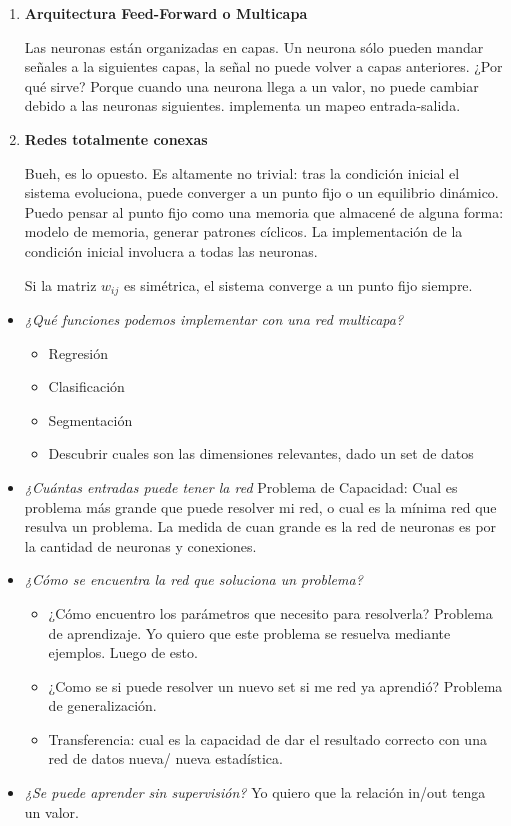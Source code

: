 \begin{enumerate}
	\item {\bf Arquitectura Feed-Forward o Multicapa}

Las neuronas están organizadas en capas. Un neurona sólo pueden mandar señales a la siguientes capas, la señal no puede volver a capas anteriores. ¿Por qué sirve? Porque cuando una neurona llega a un valor, no puede cambiar debido a las neuronas siguientes. implementa un mapeo entrada-salida.

	\item {\bf Redes totalmente conexas}

Bueh, es lo opuesto. Es altamente no trivial: tras la condición inicial el sistema evoluciona, puede converger a un punto fijo o un equilibrio dinámico. Puedo pensar al punto fijo como una memoria que almacené de alguna forma: modelo de memoria, generar patrones cíclicos. La implementación de la condición inicial involucra a todas las neuronas.

Si la matriz $w_{ij}$ es simétrica, el sistema converge a un punto fijo siempre. 


\end{enumerate}


\begin{itemize}
	\item {\sl ¿Qué funciones podemos implementar con una red multicapa?}
	\begin{itemize}
		\item Regresión
		\item Clasificación
		\item Segmentación
		\item Descubrir cuales son las dimensiones relevantes, dado un set de datos
	\end{itemize}
	\item {\sl ¿Cuántas entradas puede tener la red} Problema de Capacidad: Cual es problema más grande que puede resolver mi red, o cual es la mínima red que resulva un problema. La medida de cuan grande es la red de neuronas es por la cantidad de neuronas y conexiones.
	\item {\sl ¿Cómo se encuentra la red que soluciona un problema?}
	\begin{itemize}
		\item ¿Cómo encuentro los parámetros que necesito para resolverla? Problema de aprendizaje. Yo quiero que este problema se resuelva mediante ejemplos. Luego de esto.
		\item ¿Como se si puede resolver un nuevo set si me red ya aprendió? Problema de generalización. 
		\item Transferencia: cual es la capacidad de dar el resultado correcto con una red de datos nueva/ nueva estadística.
	\end{itemize}
	\item {\sl ¿Se puede aprender sin supervisión?} Yo quiero que la relación in/out tenga un valor.
\end{itemize}

